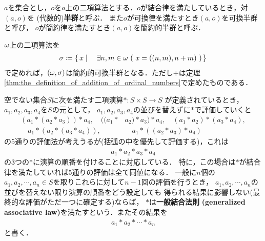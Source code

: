 	
	\begin{screen}
		\begin{dfn}[半群]
			$a$を集合とし，$o$を$a$上の二項算法とする．$o$が結合律を満たしているとき，対$(a,o)$を
			(代数的){\bf 半群}と呼ぶ．
			また$o$が可換律を満たすとき$(a,o)$を可換半群と呼び，
			$o$が簡約律を満たすとき$(a,o)$を簡約的半群と呼ぶ．
		\end{dfn}
	\end{screen}
	
	\begin{screen}
		\begin{thm}
			${\bf \omega}$上の二項算法を
			\begin{align}
				\sigma \coloneqq \Set{x}{\exists n,m \in \omg\ (\ x=((n,m),n+m)\ )}
			\end{align}
			で定めれば，$({\bf \omega},\sigma)$は簡約的可換半群となる．ただし$+$は定理
			\ref{thm:the_definition_of_addition_of_ordinal_numbers}で定めたものである．
		\end{thm}
	\end{screen}
	
	\begin{screen}
		\begin{dfn}[一般結合法則]
			空でない集合$S$に次を満たす二項演算$\ast:S \times S \longrightarrow S$
			が定義されているとき，$a_1,a_2,a_3,a_4$を$S$の元として，
			$a_1,a_2,a_3,a_4$の並びを替えずに$\ast$で評価していくと
			\begin{align}
				(a_1 \ast (a_2 \ast a_3)) \ast a_4,
				\quad ((a_1 \ast &a_2) \ast a_3) \ast a_4,
				\quad (a_1 \ast a_2) \ast (a_3 \ast a_4), \\
				\quad a_1 \ast (a_2 \ast (a_3 \ast a_4)),
				&\quad a_1 \ast ((a_2 \ast a_3) \ast a_4)
			\end{align}
			の5通りの評価法が考えうるが(括弧の中を優先して評価する)，これは
			\begin{align}
				a_1 \ast a_2 \ast a_3 \ast a_4
			\end{align}
			の3つの$\ast$に演算の順番を付けることに対応している．
			特に，この場合は$\ast$が結合律を満たしていれば5通りの評価は全て同値になる．
			一般に$n$個の$a_1,a_2,\cdots,a_n \in S$を取りこれらに対して$n-1$回の評価を行うとき，
			$a_1,a_2,\cdots,a_n$の並びを替えない限り演算の順番をどう設定しても
			得られる結果に影響しない(最終的な評価がただ一つに確定する)ならば，
			$\ast$は{\bf 一般結合法則}\index{いっぱんけつごうほうそく@一般結合法則}
			{\bf (generalized associative law)}を満たすという．またその結果を
			\begin{align}
				a_1 \ast a_2 \ast \cdots \ast a_n
			\end{align}
			と書く．
		\end{dfn}
	\end{screen}
	
